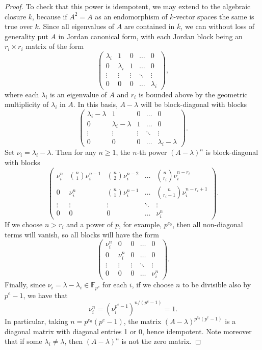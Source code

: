\documentclass[12pt]{article}
\let\bar\overline
\def\FF{\mathbb F}
\theoremstyle{theorem}
\numberwithin{thm}{section}
\theoremstyle{definition}
\begin{document}
\begin{proof}
To check that this power is idempotent, we may extend to the algebraic closure $\bar k$, because if $A^2=A$ as an endomorphism of $\bar k$-vector spaces the same is true over $k$.
  Since all eigenvalues of $A$ are contained in $\bar k$, we can without loss of generality put $A$ in Jordan canonical form, with each Jordan block being an $r_i\times r_i$ matrix of the form
  \[ \begin{pmatrix}
        \lambda_i & 1 & 0 & \dots & 0 \\
        0 & \lambda_i & 1  & \dots & 0 \\
        \vdots & \vdots & \vdots & \ddots & \vdots \\
        0 & 0 & 0 & \dots & \lambda_i
    \end{pmatrix}, \]
  where each $\lambda_i$ is an eigenvalue of $A$ and $r_i$ is bounded above by the geometric multiplicity of $\lambda_i$ in $A$.
  In this basis, $A-\lambda$ will be block-diagonal with blocks
  \[ \begin{pmatrix}
    \lambda_i-\lambda & 1 & 0 & \dots & 0 \\
    0 & \lambda_i-\lambda & 1 & \dots & 0 \\
    \vdots & \vdots & \vdots & \ddots & \vdots \\
    0 & 0 & 0 & \dots & \lambda_i-\lambda
  \end{pmatrix}. \]
  Set $\nu_i=\lambda_i-\lambda$. Then for any $n\geq 1$,
  the $n$-th power $(A-\lambda)^n$ is block-diagonal with blocks
  \[ \begin{pmatrix}
    \nu_i^n & \binom{n}1\nu_i^{n-1} & \binom{n}2\nu_i^{n-2} & \dots & \binom{n}{r_i}\nu_i^{n-r_i} \\
    0 & \nu_i^n & \binom{n}1\nu_i^{n-1} & \dots & \binom{n}{r_i-1}\nu_i^{n-r_i+1} \\
    \vdots & \vdots & \vdots & \ddots & \vdots \\
    0 & 0 & 0 & \dots & \nu_i^n
  \end{pmatrix}. \]
  If we choose $n > r_i$ and a power of $p$, for example, $p^{e_0}$, then all non-diagonal terms will vanish, so all blocks will have the form
  \[ \begin{pmatrix}
    \nu_i^n & 0 & 0 & \dots & 0 \\
    0 & \nu_i^n & 0 & \dots & 0 \\
    \vdots & \vdots & \vdots & \ddots & \vdots \\
    0 & 0 & 0 & \dots & \nu_i^n
  \end{pmatrix}. \]
  Finally, since $\nu_i =\lambda-\lambda_i \in \FF_{p^e}$ for each $i$, if we choose $n$ to be divisible also by $p^e-1$, we have that $$\nu_i^{n} = (\nu_i^{p^{e}-1})^{n/(p^{e}-1)} =1.$$
  In particular, taking $n=p^{e_0}(p^e-1)$, the matrix $(A-\lambda)^{p^{e_0}(p^e-1)}$ is a diagonal matrix with diagonal entries 1 or 0, hence idempotent. Note moreover that if some $\lambda_i\neq \lambda$, then $(A-\lambda)^n$ is not the zero matrix.
\end{proof}
\end{document}
